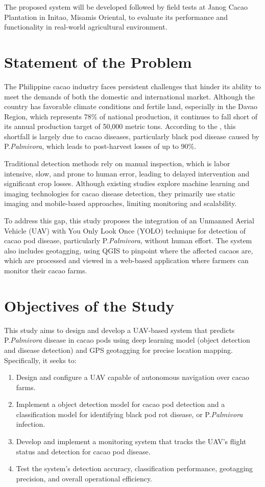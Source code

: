{The proposed system will be developed followed by field tests at Janog Cacao Plantation in Initao, Misamis Oriental, to evaluate its performance and functionality in real-world agricultural environment.


\section{Statement of the Problem}

The Philippine cacao industry faces persistent challenges that hinder its ability to meet the demands of both the domestic and international market. Although the country has favorable climate conditions and fertile land, especially in the Davao Region, which represents 78\% of national production, it continues to fall short of its annual production target of 50,000 metric tons. According to the \cite{PhilCacaoRoadmap2021}, this shortfall is largely due to cacao diseases, particularly black pod disease caused by P.\textit{Palmivora}, which leads to post-harvest losses of up to 90\%.

Traditional detection methods rely on manual inspection, which is labor intensive, slow, and prone to human error, leading to delayed intervention and significant crop losses. Although existing studies explore machine learning and imaging technologies for cacao disease detection, they primarily use static imaging and mobile-based approaches, limiting monitoring and scalability.

To address this gap, this study proposes the integration of an Unmanned Aerial Vehicle (UAV) with You Only Look Once (YOLO) technique for detection of cacao pod disease, particularly P.\textit{Palmivora}, without human effort. The system also includes geotagging, using QGIS to pinpoint where the affected cacaos are, which are processed and viewed in a web-based application where farmers can monitor their cacao farms.

\section{Objectives of the Study}

This study aims to design and develop a UAV-based system that predicts P.\textit{Palmivora} disease in cacao pods using deep learning model (object detection and disease detection) and GPS geotagging for precise location mapping. Specifically, it seeks to:

\begin{enumerate}
	\item Design and configure a UAV capable of autonomous navigation over cacao farms.
	\item Implement a object detection model for cacao pod detection and a classification model for identifying black pod rot disease, or P.\textit{Palmivora} infection.
	\item Develop and implement a monitoring system that tracks the UAV’s flight status and detection for cacao pod disease.
	\item Test the system’s detection accuracy, classification performance, geotagging precision, and overall operational efficiency.
\end{enumerate}

}
